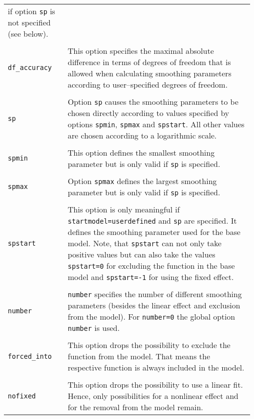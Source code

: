 \begin{longtable}{p{2.2cm} p{13.3cm}}
                 if option {\tt sp} is not specified (see below). \\
            & \\
{\tt df\_accuracy} & This option specifies the maximal absolute difference in terms of
                     degrees of freedom that is allowed when calculating smoothing parameters
                     according to user--specified degrees of freedom. \\
            & \\
{\tt sp} & Option {\tt sp} causes the smoothing parameters to be chosen directly according
           to values specified by options {\tt spmin}, {\tt spmax} and {\tt spstart}.
           All other values are chosen according to a logarithmic scale. \\
            & \\
{\tt spmin} & This option defines the smallest smoothing parameter but is only valid if
              {\tt sp} is specified. \\
            & \\
{\tt spmax} & Option {\tt spmax} defines the largest smoothing parameter but is only valid if
              {\tt sp} is specified. \\
            & \\
{\tt spstart} & This option is only meaningful if {\tt startmodel=userdefined} and {\tt sp}
                are specified. It defines the smoothing parameter used for the base model. Note, that {\tt spstart}
                can not only take positive values but can also take the values {\tt spstart=0} for
                excluding the function in the base model and {\tt spstart=-1} for using the fixed effect. \\
            & \\
{\tt number} & {\tt number} specifies the number of different smoothing parameters
               (besides the linear effect and exclusion from the model). For {\tt number=0} the
               global option {\tt number} is used. \\
            & \\
{\tt forced\_into} & This option drops the possibility to exclude the function from the model. That means the respective function
                     is always included in the model. \\
            & \\
{\tt nofixed} & This option drops the possibility to use a linear fit. Hence, only possibilities
for a nonlinear effect and for the removal from the model remain. \\

\end{longtable}
